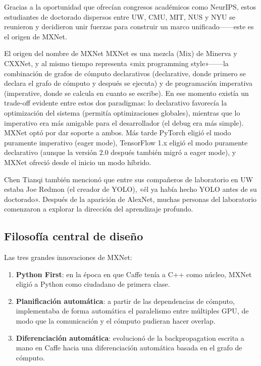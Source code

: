 \documentclass[a4paper]{article}
\begin{document}
Gracias a la oportunidad que ofrecían congresos académicos como NeurIPS, estos estudiantes de doctorado dispersos entre UW, CMU, MIT, NUS y NYU se reunieron y decidieron unir fuerzas para construir un marco unificado------este es el origen de MXNet.

\begin{knowledgebox}{El origen del nombre de MXNet}
MXNet es una mezcla (Mix) de Minerva y CXXNet, y al mismo tiempo representa «mix programming style»------la combinación de grafos de cómputo declarativos (declarative, donde primero se declara el grafo de cómputo y después se ejecuta) y de programación imperativa (imperative, donde se calcula en cuanto se escribe). En ese momento existía un trade-off evidente entre estos dos paradigmas: lo declarativo favorecía la optimización del sistema (permitía optimizaciones globales), mientras que lo imperativo era más amigable para el desarrollador (el debug era más simple). MXNet optó por dar soporte a ambos. Más tarde PyTorch eligió el modo puramente imperativo (eager mode), TensorFlow 1.x eligió el modo puramente declarativo (aunque la versión 2.0 después también migró a eager mode), y MXNet ofreció desde el inicio un modo híbrido.
\end{knowledgebox}

Chen Tianqi también mencionó que entre sus compañeros de laboratorio en UW estaba Joe Redmon (el creador de YOLO), «él ya había hecho YOLO antes de su doctorado». Después de la aparición de AlexNet, muchas personas del laboratorio comenzaron a explorar la dirección del aprendizaje profundo.

\subsection{Filosofía central de diseño}

Las tres grandes innovaciones de MXNet:
\begin{enumerate}
    \item \textbf{Python First}: en la época en que Caffe tenía a C++ como núcleo, MXNet eligió a Python como ciudadano de primera clase.
    \item \textbf{Planificación automática}: a partir de las dependencias de cómputo, implementaba de forma automática el paralelismo entre múltiples GPU, de modo que la comunicación y el cómputo pudieran hacer overlap.
    \item \textbf{Diferenciación automática}: evolucionó de la backpropagation escrita a mano en Caffe hacia una diferenciación automática basada en el grafo de cómputo.
\end{enumerate}
\end{document}
